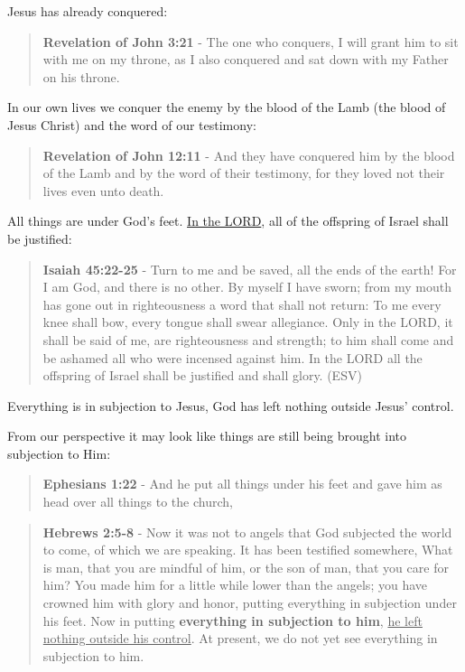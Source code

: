 \documentclass[11pt]{article}
\begin{document}
Jesus has already conquered:

\begin{quote}
\textbf{Revelation of John 3:21} - The one who conquers, I will grant him to sit with me on my throne, as I also conquered and sat down with my Father on his throne.
\end{quote}

In our own lives we conquer the enemy by the blood of the Lamb (the blood of Jesus Christ) and the word of our testimony:

\begin{quote}
\textbf{Revelation of John 12:11} - And they have conquered him by the blood of the Lamb and by the word of their testimony, for they loved not their lives even unto death.
\end{quote}

All things are under God's feet. \uline{In the LORD}, all of the offspring of Israel shall be justified:

\begin{quote}
\textbf{Isaiah 45:22-25} - Turn to me and be saved, all the ends of the earth! For I am God, and there is no other. By myself I have sworn; from my mouth has gone out in righteousness a word that shall not return: To me every knee shall bow, every tongue shall swear allegiance. Only in the LORD, it shall be said of me, are righteousness and strength; to him shall come and be ashamed all who were incensed against him. In the LORD all the offspring of Israel shall be justified and shall glory. (ESV)
\end{quote}

Everything is in subjection to Jesus, God has left nothing outside Jesus' control.

From our perspective it may look like things are still being brought into subjection to Him:

\begin{quote}
\textbf{Ephesians 1:22} - And he put all things under his feet and gave him as head over all things to the church,
\end{quote}

\begin{quote}
\textbf{Hebrews 2:5-8} - Now it was not to angels that God subjected the world to come, of which we are speaking. It has been testified somewhere, What is man, that you are mindful of him, or the son of man, that you care for him? You made him for a little while lower than the angels; you have crowned him with glory and honor, putting everything in subjection under his feet. Now in putting \textbf{everything in subjection to him}, \uline{he left nothing outside his control}. At present, we do not yet see everything in subjection to him.
\end{quote}
\end{document}
